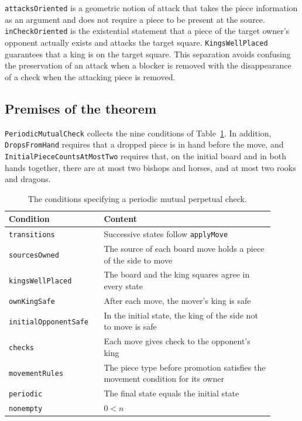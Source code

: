 \documentclass[a4paper,11pt]{article}
\newcommand{\code}[1]{{\small\nolinkurl{#1}}}
\theoremstyle{definition}
\begin{document}
\code{attacksOriented} is a geometric notion of attack that takes the piece information as an argument and does not require a piece to be present at the source.
\code{inCheckOriented} is the existential statement that a piece of the target owner's opponent actually exists and attacks the target square.
\code{KingsWellPlaced} guarantees that a king is on the target square.
This separation avoids confusing the preservation of an attack when a blocker is removed with the disappearance of a check when the attacking piece is removed.

\subsection{Premises of the theorem}
\code{PeriodicMutualCheck} collects the nine conditions of Table~\ref{tab:premises}.
In addition, \code{DropsFromHand} requires that a dropped piece is in hand before the move, and \code{InitialPieceCountsAtMostTwo} requires that, on the initial board and in both hands together, there are at most two bishops and horses, and at most two rooks and dragons.

\begin{table}[ht]
\centering\small
\begin{tabular}{p{0.31\linewidth}p{0.59\linewidth}}
\toprule
Condition & Content\\\midrule
\code{transitions} & Successive states follow \code{applyMove}\\
\code{sourcesOwned} & The source of each board move holds a piece of the side to move\\
\code{kingsWellPlaced} & The board and the king squares agree in every state\\
\code{ownKingSafe} & After each move, the mover's king is safe\\
\code{initialOpponentSafe} & In the initial state, the king of the side not to move is safe\\
\code{checks} & Each move gives check to the opponent's king\\
\code{movementRules} & The piece type before promotion satisfies the movement condition for its owner\\
\code{periodic} & The final state equals the initial state\\
\code{nonempty} & \(0<n\)\\\bottomrule
\end{tabular}
\caption{The conditions specifying a periodic mutual perpetual check.}\label{tab:premises}
\end{table}
\end{document}
